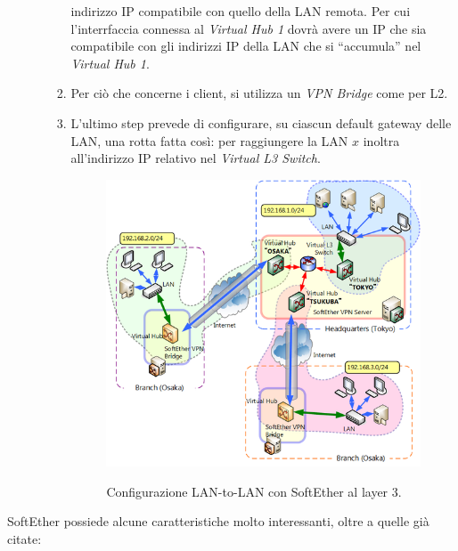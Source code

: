 \begin{itemize}
\begin{itemize}
\begin{enumerate}
      indirizzo IP compatibile con quello della LAN remota. Per cui l'interrfaccia connessa al \textit{Virtual Hub 1}
      dovrà avere un IP che sia compatibile con gli indirizzi IP della LAN che si ``accumula'' nel \textit{Virtual
      Hub 1}.
      \item Per ciò che concerne i client, si utilizza un \textit{VPN Bridge} come
      per L2.
      \item L'ultimo step prevede di configurare, su ciascun default gateway delle LAN, una rotta fatta
      così: per raggiungere la LAN $x$ inoltra all'indirizzo IP relativo nel \textit{Virtual L3 Switch}.
      \begin{figure}
        \includegraphics[scale=0.45]{img/softether_l3_lan_to_lan}
        \label{fig:softether_l3_lan_to_lan}
        \caption[Configurazione LAN-to-LAN con SoftEther al layer 3]{Configurazione LAN-to-LAN con SoftEther al layer 3.}
      \end{figure}
    \end{enumerate}
  \end{itemize}
\end{itemize}
SoftEther possiede alcune caratteristiche molto interessanti, oltre a quelle già citate:

